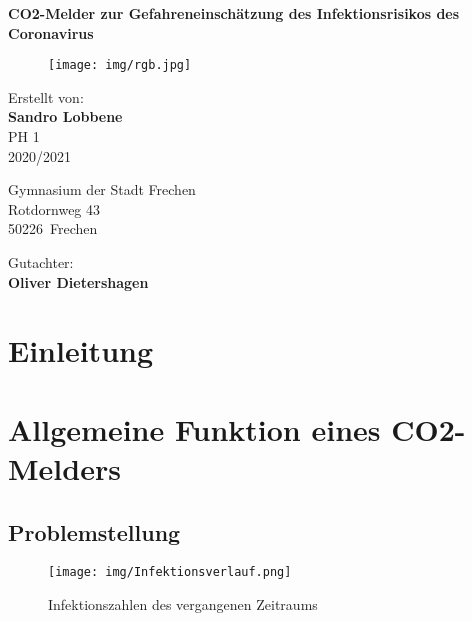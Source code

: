 \documentclass[12pt,a4paper,oneside,english]{article}
\title{\haThema}
\author{\haAutor}
\date{\today}
\newcommand{\leadingzero}[1]{\ifnum #1<10 0\the#1\else\the#1\fi}
\newcommand{\datumVonHeute}{\leadingzero{\day}.\leadingzero{\month}.\the\year}
\newcommand{\haThema}{CO2-Melder zur Gefahreneinschätzung des Infektionsrisikos des Coronavirus}
\newcommand{\haAutor}{Sandro Lobbene}
\newcommand{\haAutorAdresse}{Musterstr. 1}
\newcommand{\haAutorPLZ}{12345}
\newcommand{\haAutorOrt}{Musterhausen}
\newcommand{\haSchule}{Gymnasium der Stadt Frechen}
\newcommand{\haSchuleAdresse}{Rotdornweg 43}
\newcommand{\haSchulePLZ}{50226}
\newcommand{\haSchuleOrt}{Frechen}
\newcommand{\haGutachter}{Oliver Dietershagen}
\begin{document}
\begin{titlepage}
\begin{center}
{\LARGE\bfseries \haThema \par}
\vfill
\begin{figure}[hbtp]
\begin{center}
\texttt{[image: img/rgb.jpg]}
\label{imgDeckbild}
\end{center}
\end{figure}

Erstellt von:\\ {\bfseries \haAutor}\\ 
PH 1\\
2020/2021
\par
\vspace{1cm}
{\haSchule \\ \haSchuleAdresse \\ \haSchulePLZ~\haSchuleOrt \par}
\vspace{1cm}
Gutachter:\\ {\bfseries \haGutachter}
\vfill
\end{center}
\end{titlepage}
\thispagestyle{empty}
\newpage


\tableofcontents
\thispagestyle{empty}
\newpage

\setcounter{page}{1}



\section{Einleitung}


\newpage
\section{Allgemeine Funktion eines CO2-Melders}
\subsection {Problemstellung}

\begin{figure}[hbtp]
	\centering
	\texttt{[image: img/Infektionsverlauf.png]}
	\caption{Infektionszahlen des vergangenen Zeitraums}
	\label{imgInfektionsverlauf}
\end{figure}
\end{document}
